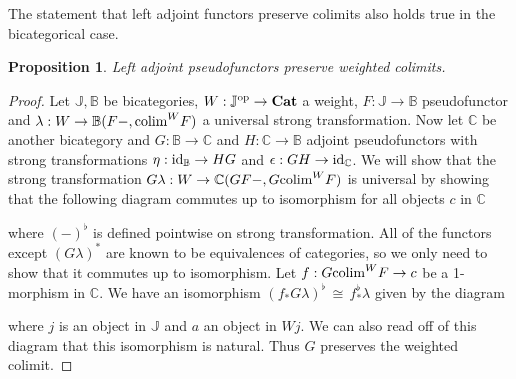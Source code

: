 \documentclass[12pt,oneside,reqno,a4paper]{article}
\newtheorem{proposition}[theorem]{Proposition}
\theoremstyle{definition}
\newcommand{\op}{^\textup{op}}
\newcommand{\Cat}{\textbf{\textup{Cat}}}
\newcommand{\Bicat}{\textbf{\textup{Bicat}}}
\newcommand{\es}{^\flat}
\newcommand{\iso}{\,\cong\,}
\newcommand{\id}{\textup{id}}
\newcommand{\bB}{\mathbb{B}}
\newcommand{\bC}{\mathbb{C}}
\newcommand{\bJ}{\mathbb{J}}
\newcommand{\colim}{\textup{colim}}
\begin{document}
The statement that left adjoint functors preserve colimits also holds true in the bicategorical case.

\begin{proposition} \label{adjpres}
Left adjoint pseudofunctors preserve weighted colimits.
\end{proposition}

\begin{proof}
Let $\bJ,\bB$ be bicategories, $W:\bJ\op\to\Cat$ a weight, $F:\bJ\to\bB$ pseudofunctor and $\lambda:W\to \bB(F-,\colim^W F)$ a universal strong transformation. Now let $\bC$ be another bicategory and $G:\bB\to\bC$ and $H:\bC\to\bB$ adjoint pseudofunctors with strong transformations $\eta:\id_\bB\to HG$ and $\epsilon:GH\to \id_{\bC}$. We will show that the strong transformation $G\lambda:W\to \bC(GF-,G\colim^W F)$ is universal by showing that the following diagram commutes up to isomorphism for all objects $c$ in $\bC$
\begin{center}
\end{center}
where $(-)\es$ is defined pointwise on strong transformation. All of the functors except $(G\lambda)^*$ are known to be equivalences of categories, so we only need to show that it commutes up to isomorphism. Let $f:G\colim^W F\to c$ be a 1-morphism in $\bC$. We have an isomorphism $(f_*G\lambda)\es\iso f\es_*\lambda$ given by the diagram
\begin{center}
\end{center}
where $j$ is an object in $\bJ$ and $a$ an object in $Wj$. We can also read off of this diagram that this isomorphism is natural. Thus $G$ preserves the weighted colimit.
\end{proof}
\end{document}
